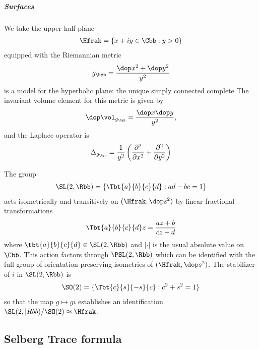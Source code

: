 \subparagraph{Surfaces}
We take the upper half plane
\begin{align*}
  \Hfrak = \{ x+iy \in \Cbb : y >0\}
\end{align*}
equipped with the Riemannian metric
\begin{align*}
  g_\hyp = \frac{\dop x^2 +\dop y^2}{y^2}
\end{align*}
is a model for the hyperbolic plane: the unique simply connected complete  The invariant volume element for this metric is given by
\begin{align*}
  \dop \vol_{g_\hyp} = \frac{\dop x \dop y}{y^2},
\end{align*}
and the Laplace operator is
\begin{align*}
  \Delta_{g_\hyp} = \frac{1}{y^2}\left( \frac{\partial^2 }{\partial x^2}+ \frac{\partial^2 }{\partial y^2} \right)
\end{align*}

The group
\begin{align*}
  \SL(2,\Rbb) = \left\{ \Tbt{a}{b}{c}{d}: ad-bc =1 \right\}
\end{align*}
acts isometrically and transitively on $(\Hfrak,\dop s^2)$ by linear fractional transformations
\begin{align*}
  \Tbt{a}{b}{c}{d} z = \frac{az+b}{cz+d} %
\end{align*}
where $\tbt{a}{b}{c}{d} \in \SL(2,\Rbb)$ and $|\cdot|$ is the usual absolute value on $\Cbb$. This action factors through $\PSL(2,\Rbb)$ which can be identified with the full group of orientation preserving isometries of $(\Hfrak,\dop s^2)$. The stabilizer of $i$ in $\SL(2,\Rbb)$ is
\begin{align*}
  \SO(2) = \{\Tbt{c}{s}{-s}{c}: c^2 + s^2 =1\}
\end{align*}
so that the map $g \mapsto g i$ establishes an identification $\SL(2,|Rbb) / \SO(2) \approx \Hfrak$.

\subsection{Selberg Trace formula}